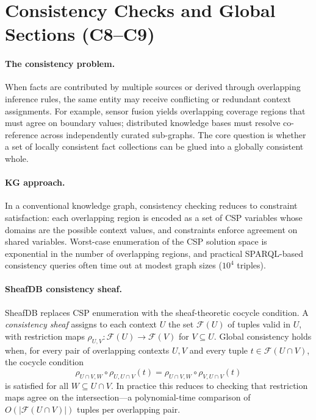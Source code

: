 \section{Consistency Checks and Global Sections (C8--C9)}
\label{sec:consistency}

\paragraph{The consistency problem.}
When facts are contributed by multiple sources or derived through overlapping inference rules, the same entity may receive conflicting or redundant context assignments. For example, sensor fusion yields overlapping coverage regions that must agree on boundary values; distributed knowledge bases must resolve co-reference across independently curated sub-graphs. The core question is whether a set of locally consistent fact collections can be glued into a globally consistent whole.

\paragraph{KG approach.}
In a conventional knowledge graph, consistency checking reduces to constraint satisfaction: each overlapping region is encoded as a set of CSP variables whose domains are the possible context values, and constraints enforce agreement on shared variables. Worst-case enumeration of the CSP solution space is exponential in the number of overlapping regions, and practical SPARQL-based consistency queries often time out at modest graph sizes ($10^4$ triples).

\paragraph{SheafDB consistency sheaf.}
SheafDB replaces CSP enumeration with the sheaf-theoretic cocycle condition. A \emph{consistency sheaf} assigns to each context $U$ the set $\mathcal{F}(U)$ of tuples valid in $U$, with restriction maps $\rho_{U,V}: \mathcal{F}(U) \to \mathcal{F}(V)$ for $V \subseteq U$. Global consistency holds when, for every pair of overlapping contexts $U, V$ and every tuple $t \in \mathcal{F}(U \cap V)$, the cocycle condition
\[
\rho_{U \cap V, W} \circ \rho_{U, U \cap V}(t) = \rho_{U \cap V, W} \circ \rho_{V, U \cap V}(t)
\]
is satisfied for all $W \subseteq U \cap V$. In practice this reduces to checking that restriction maps agree on the intersection---a polynomial-time comparison of $O(|\mathcal{F}(U \cap V)|)$ tuples per overlapping pair.

